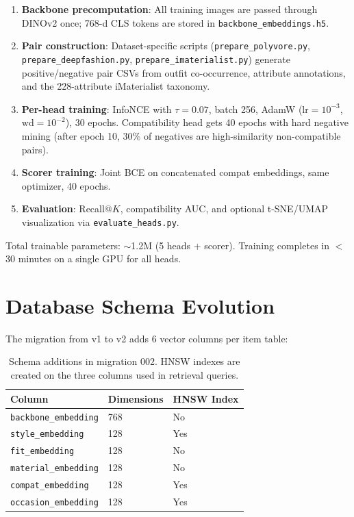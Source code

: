\documentclass[10pt,twocolumn]{article}
\begin{document}
\begin{enumerate}[leftmargin=*,topsep=2pt,itemsep=1pt]
\item \textbf{Backbone precomputation}: All training images are passed
  through DINOv2 once; 768-d CLS tokens are stored in
  \texttt{backbone\_embeddings.h5}.
\item \textbf{Pair construction}: Dataset-specific scripts
  (\texttt{prepare\_polyvore.py}, \texttt{prepare\_deepfashion.py},
  \texttt{prepare\_imaterialist.py}) generate positive/negative pair
  CSVs from outfit co-occurrence, attribute annotations, and the
  228-attribute iMaterialist taxonomy.
\item \textbf{Per-head training}: InfoNCE with $\tau{=}0.07$, batch 256,
  AdamW ($\text{lr}{=}10^{-3}$, $\text{wd}{=}10^{-2}$), 30 epochs.
  Compatibility head gets 40 epochs with hard negative mining (after
  epoch 10, 30\% of negatives are high-similarity non-compatible pairs).
\item \textbf{Scorer training}: Joint BCE on concatenated compat
  embeddings, same optimizer, 40 epochs.
\item \textbf{Evaluation}: Recall@$K$, compatibility AUC, and optional
  t-SNE/UMAP visualization via \texttt{evaluate\_heads.py}.
\end{enumerate}

Total trainable parameters: $\sim$1.2M (5 heads + scorer).  Training
completes in $<$30 minutes on a single GPU for all heads.

\section{Database Schema Evolution}
\label{sec:schema}

The migration from v1 to v2 adds 6 vector columns per item table:

\begin{table}[t]
\centering
\small
\caption{Schema additions in migration 002.  HNSW indexes are created
on the three columns used in retrieval queries.}
\label{tab:schema}
\begin{tabular}{@{}lll@{}}
\toprule
Column & Dimensions & HNSW Index \\
\midrule
\texttt{backbone\_embedding} & 768 & No \\
\texttt{style\_embedding} & 128 & Yes \\
\texttt{fit\_embedding} & 128 & No \\
\texttt{material\_embedding} & 128 & No \\
\texttt{compat\_embedding} & 128 & Yes \\
\texttt{occasion\_embedding} & 128 & Yes \\
\bottomrule
\end{tabular}
\end{table}
\end{document}

